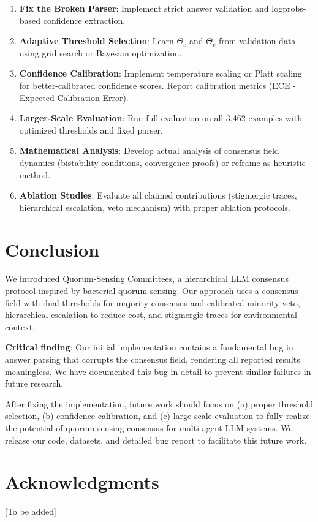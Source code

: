 \documentclass[11pt,letterpaper]{article}
\begin{document}
\begin{enumerate}
\item \textbf{Fix the Broken Parser}: Implement strict answer validation and logprobs-based confidence extraction.

\item \textbf{Adaptive Threshold Selection}: Learn $\Theta_c$ and $\Theta_v$ from validation data using grid search or Bayesian optimization.

\item \textbf{Confidence Calibration}: Implement temperature scaling \cite{TemperatureScaling2017} or Platt scaling \cite{PlattScaling} for better-calibrated confidence scores. Report calibration metrics (ECE - Expected Calibration Error).

\item \textbf{Larger-Scale Evaluation}: Run full evaluation on all 3,462 examples with optimized thresholds and fixed parser.

\item \textbf{Mathematical Analysis}: Develop actual analysis of consensus field dynamics (bistability conditions, convergence proofs) or reframe as heuristic method.

\item \textbf{Ablation Studies}: Evaluate all claimed contributions (stigmergic traces, hierarchical escalation, veto mechanism) with proper ablation protocols.
\end{enumerate}

\section{Conclusion}

We introduced Quorum-Sensing Committees, a hierarchical LLM consensus protocol inspired by bacterial quorum sensing. Our approach uses a consensus field with dual thresholds for majority consensus and calibrated minority veto, hierarchical escalation to reduce cost, and stigmergic traces for environmental context.

\textbf{Critical finding}: Our initial implementation contains a fundamental bug in answer parsing that corrupts the consensus field, rendering all reported results meaningless. We have documented this bug in detail to prevent similar failures in future research.

After fixing the implementation, future work should focus on (a) proper threshold selection, (b) confidence calibration, and (c) large-scale evaluation to fully realize the potential of quorum-sensing consensus for multi-agent LLM systems. We release our code, datasets, and detailed bug report to facilitate this future work.

\section*{Acknowledgments}

[To be added]



\end{document}
